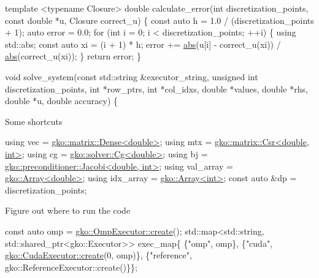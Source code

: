 \begin{DoxyCode}
\textcolor{keyword}{template} <\textcolor{keyword}{typename} Closure>
\textcolor{keywordtype}{double} calculate\_error(\textcolor{keywordtype}{int} discretization\_points, \textcolor{keyword}{const} \textcolor{keywordtype}{double} *u,
                       Closure correct\_u)
\{
    \textcolor{keyword}{const} \textcolor{keyword}{auto} h = 1.0 / (discretization\_points + 1);
    \textcolor{keyword}{auto} error = 0.0;
    \textcolor{keywordflow}{for} (\textcolor{keywordtype}{int} i = 0; i < discretization\_points; ++i) \{
        \textcolor{keyword}{using} std::abs;
        \textcolor{keyword}{const} \textcolor{keyword}{auto} xi = (i + 1) * h;
        error += \hyperlink{namespacegko_a57797fc0a00fd4b7ff34ca4bfc84bc51}{abs}(u[i] - correct\_u(xi)) / \hyperlink{namespacegko_a57797fc0a00fd4b7ff34ca4bfc84bc51}{abs}(correct\_u(xi));
    \}
    \textcolor{keywordflow}{return} error;
\}


\textcolor{keywordtype}{void} solve\_system(\textcolor{keyword}{const} std::string &executor\_string,
                  \textcolor{keywordtype}{unsigned} \textcolor{keywordtype}{int} discretization\_points, \textcolor{keywordtype}{int} *row\_ptrs,
                  \textcolor{keywordtype}{int} *col\_idxs, \textcolor{keywordtype}{double} *values, \textcolor{keywordtype}{double} *rhs, \textcolor{keywordtype}{double} *u,
                  \textcolor{keywordtype}{double} accuracy)
\{
\end{DoxyCode}


Some shortcuts


\begin{DoxyCode}
\textcolor{keyword}{using} vec = \hyperlink{classgko_1_1matrix_1_1Dense}{gko::matrix::Dense<double>};
\textcolor{keyword}{using} mtx = \hyperlink{classgko_1_1matrix_1_1Csr}{gko::matrix::Csr<double, int>};
\textcolor{keyword}{using} cg = \hyperlink{classgko_1_1solver_1_1Cg}{gko::solver::Cg<double>};
\textcolor{keyword}{using} bj = \hyperlink{classgko_1_1preconditioner_1_1Jacobi}{gko::preconditioner::Jacobi<double, int>};
\textcolor{keyword}{using} val\_array = \hyperlink{classgko_1_1Array}{gko::Array<double>};
\textcolor{keyword}{using} idx\_array = \hyperlink{classgko_1_1Array}{gko::Array<int>};
\textcolor{keyword}{const} \textcolor{keyword}{auto} &dp = discretization\_points;
\end{DoxyCode}


Figure out where to run the code


\begin{DoxyCode}
\textcolor{keyword}{const} \textcolor{keyword}{auto} omp = \hyperlink{classgko_1_1OmpExecutor_a33ca05fdd0fc928ee262fc9425304874}{gko::OmpExecutor::create}();
std::map<std::string, std::shared\_ptr<gko::Executor>> exec\_map\{
    \{\textcolor{stringliteral}{"omp"}, omp\},
    \{\textcolor{stringliteral}{"cuda"}, \hyperlink{classgko_1_1CudaExecutor_a2718a92034350650ef406ffdb60db090}{gko::CudaExecutor::create}(0, omp)\},
    \{\textcolor{stringliteral}{"reference"}, gko::ReferenceExecutor::create()\}\};
\end{DoxyCode}


